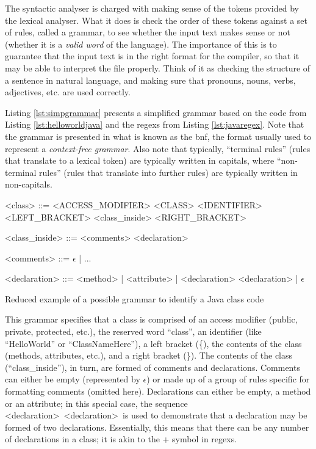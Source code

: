 The syntactic analyser is charged with making sense of the tokens provided by the lexical analyser. What it does is check the order of these tokens against a set of rules, called a \gls{grammar}, to see whether the input text makes sense or not (whether it is a \emph{valid word} of the language). The importance of this is to guarantee that the input text is in the right format for the compiler, so that it may be able to interpret the file properly. Think of it as checking the structure of a sentence in natural language, and making sure that pronouns, nouns, verbs, adjectives, etc. are used correctly.

Listing \ref{lst:simpgrammar} presents a simplified grammar based on the code from Listing \ref{lst:helloworldjava} and the \gls{regex}s from Listing \ref{lst:javaregex}. Note that the \gls{grammar} is presented in what is known as the \acrfull{bnf}, the format usually used to represent a \emph{context-free grammar}. Also note that typically, ``terminal rules'' (rules that translate to a lexical token) are typically written in capitals, where ``non-terminal rules'' (rules that translate into further rules) are typically written in non-capitals.

\begin{listing}
\begin{grammar}
<class> ::= <ACCESS_MODIFIER> <CLASS> <IDENTIFIER> <LEFT_BRACKET> <class_inside> <RIGHT_BRACKET>

<class_inside> ::= <comments> <declaration>

<comments> ::= $\epsilon$ | ...

<declaration> ::= <method> | <attribute> | <declaration> <declaration> | $\epsilon$
\end{grammar}
\caption{Reduced example of a possible grammar to identify a Java class code} \label{lst:simpgrammar}
\end{listing}

This \gls{grammar} specifies that a class is comprised of an access modifier (public, private, protected, etc.), the reserved word ``class'', an identifier (like ``HelloWorld'' or ``ClassNameHere''), a left bracket (\{), the contents of the class (methods, attributes, etc.), and a right bracket (\}). The contents of the class (``class_inside''), in turn, are formed of comments and declarations. Comments can either be empty (represented by $\epsilon$) or made up of a group of rules specific for formatting comments (omitted here). Declarations can either be empty, a method or an attribute; in this special case, the sequence \textless declaration\textgreater \ \textless declaration\textgreater \ is used to demonstrate that a declaration may be formed of two declarations. Essentially, this means that there can be any number of declarations in a class; it is akin to the + symbol in \gls{regex}s.

